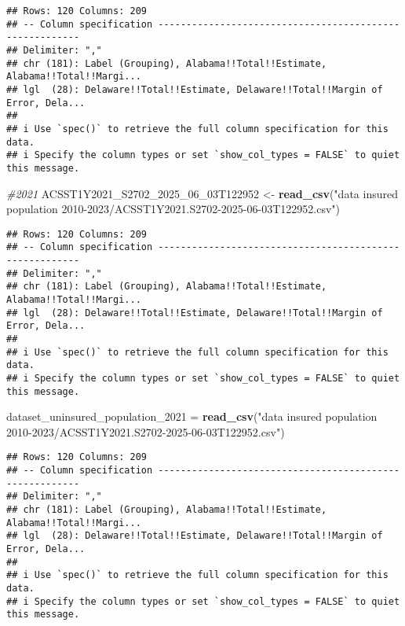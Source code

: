 \documentclass[
]{article}
\newenvironment{Shaded}{\begin{snugshade}}{\end{snugshade}}
\newcommand{\CommentTok}[1]{\textcolor[rgb]{0.56,0.35,0.01}{\textit{#1}}}
\newcommand{\FunctionTok}[1]{\textcolor[rgb]{0.13,0.29,0.53}{\textbf{#1}}}
\newcommand{\NormalTok}[1]{#1}
\newcommand{\OtherTok}[1]{\textcolor[rgb]{0.56,0.35,0.01}{#1}}
\newcommand{\StringTok}[1]{\textcolor[rgb]{0.31,0.60,0.02}{#1}}
\begin{document}
\begin{verbatim}
## Rows: 120 Columns: 209
## -- Column specification --------------------------------------------------------
## Delimiter: ","
## chr (181): Label (Grouping), Alabama!!Total!!Estimate, Alabama!!Total!!Margi...
## lgl  (28): Delaware!!Total!!Estimate, Delaware!!Total!!Margin of Error, Dela...
## 
## i Use `spec()` to retrieve the full column specification for this data.
## i Specify the column types or set `show_col_types = FALSE` to quiet this message.
\end{verbatim}

\begin{Shaded}
\begin{Highlighting}[]
\CommentTok{\#2021}
\NormalTok{ACSST1Y2021\_S2702\_2025\_06\_03T122952 }\OtherTok{\textless{}{-}} \FunctionTok{read\_csv}\NormalTok{(}\StringTok{"data insured population 2010{-}2023/ACSST1Y2021.S2702{-}2025{-}06{-}03T122952.csv"}\NormalTok{)}
\end{Highlighting}
\end{Shaded}

\begin{verbatim}
## Rows: 120 Columns: 209
## -- Column specification --------------------------------------------------------
## Delimiter: ","
## chr (181): Label (Grouping), Alabama!!Total!!Estimate, Alabama!!Total!!Margi...
## lgl  (28): Delaware!!Total!!Estimate, Delaware!!Total!!Margin of Error, Dela...
## 
## i Use `spec()` to retrieve the full column specification for this data.
## i Specify the column types or set `show_col_types = FALSE` to quiet this message.
\end{verbatim}

\begin{Shaded}
\begin{Highlighting}[]
\NormalTok{dataset\_uninsured\_population\_2021 }\OtherTok{=} \FunctionTok{read\_csv}\NormalTok{(}\StringTok{"data insured population 2010{-}2023/ACSST1Y2021.S2702{-}2025{-}06{-}03T122952.csv"}\NormalTok{)}
\end{Highlighting}
\end{Shaded}

\begin{verbatim}
## Rows: 120 Columns: 209
## -- Column specification --------------------------------------------------------
## Delimiter: ","
## chr (181): Label (Grouping), Alabama!!Total!!Estimate, Alabama!!Total!!Margi...
## lgl  (28): Delaware!!Total!!Estimate, Delaware!!Total!!Margin of Error, Dela...
## 
## i Use `spec()` to retrieve the full column specification for this data.
## i Specify the column types or set `show_col_types = FALSE` to quiet this message.
\end{verbatim}
\end{document}
